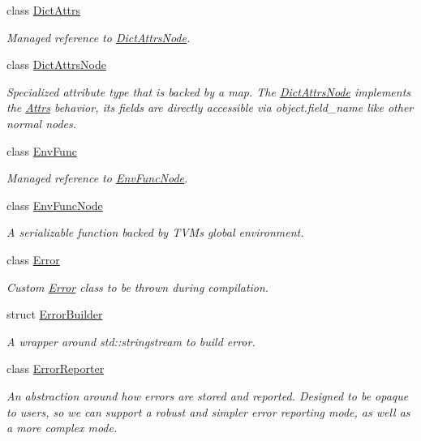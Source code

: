 \begin{DoxyCompactItemize}
class \hyperlink{classtvm_1_1DictAttrs}{Dict\+Attrs}
\begin{DoxyCompactList}\small\item\em Managed reference to \hyperlink{classtvm_1_1DictAttrsNode}{Dict\+Attrs\+Node}. \end{DoxyCompactList}\item 
class \hyperlink{classtvm_1_1DictAttrsNode}{Dict\+Attrs\+Node}
\begin{DoxyCompactList}\small\item\em Specialized attribute type that is backed by a map. The \hyperlink{classtvm_1_1DictAttrsNode}{Dict\+Attrs\+Node} implements the \hyperlink{classtvm_1_1Attrs}{Attrs} behavior, its fields are directly accessible via object.\+field\+\_\+name like other normal nodes. \end{DoxyCompactList}\item 
class \hyperlink{classtvm_1_1EnvFunc}{Env\+Func}
\begin{DoxyCompactList}\small\item\em Managed reference to \hyperlink{classtvm_1_1EnvFuncNode}{Env\+Func\+Node}. \end{DoxyCompactList}\item 
class \hyperlink{classtvm_1_1EnvFuncNode}{Env\+Func\+Node}
\begin{DoxyCompactList}\small\item\em A serializable function backed by T\+VM\textquotesingle{}s global environment. \end{DoxyCompactList}\item 
class \hyperlink{classtvm_1_1Error}{Error}
\begin{DoxyCompactList}\small\item\em Custom \hyperlink{classtvm_1_1Error}{Error} class to be thrown during compilation. \end{DoxyCompactList}\item 
struct \hyperlink{structtvm_1_1ErrorBuilder}{Error\+Builder}
\begin{DoxyCompactList}\small\item\em A wrapper around std\+::stringstream to build error. \end{DoxyCompactList}\item 
class \hyperlink{classtvm_1_1ErrorReporter}{Error\+Reporter}
\begin{DoxyCompactList}\small\item\em An abstraction around how errors are stored and reported. Designed to be opaque to users, so we can support a robust and simpler error reporting mode, as well as a more complex mode. \end{DoxyCompactList}\item 

\end{DoxyCompactItemize}
